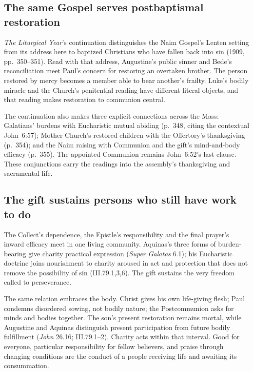 \subsection*{The same Gospel serves postbaptismal restoration}

\emph{The Liturgical Year}'s continuation distinguishes the Naim Gospel's
Lenten setting from its address here to baptized Christians who have fallen
back into sin (1909, pp.~350--351). Read with that address, Augustine's
public sinner and Bede's reconciliation meet Paul's concern for restoring
an overtaken brother. The person restored by mercy becomes a
member able to bear another's frailty. Luke's bodily miracle and the
Church's penitential reading have different literal objects, and that
reading makes restoration to communion central.

The continuation also makes three explicit connections across the Mass:
Galatians' burdens with Eucharistic mutual abiding (p.~348, citing the
contextual John~6:57); Mother Church's restored children with the
Offertory's thanksgiving (p.~354); and the Naim raising with Communion and
the gift's mind-and-body efficacy (p.~355). The appointed Communion remains
John~6:52's last clause. These conjunctions carry the readings into the
assembly's thanksgiving and sacramental life.

\subsection*{The gift sustains persons who still have work to do}

The Collect's dependence, the Epistle's responsibility and the final prayer's
inward efficacy meet in one living community. Aquinas's three forms of
burden-bearing give charity practical expression (\emph{Super Galatas}
6.1); his Eucharistic doctrine joins nourishment to charity aroused in act
and protection that does not remove the possibility of sin
(III.79.1,3,6). The gift sustains the very freedom called to perseverance.

The same relation embraces the body. Christ gives his own life-giving flesh;
Paul condemns disordered sowing, not bodily nature; the Postcommunion asks
for minds and bodies together. The son's present restoration remains
mortal, while Augustine and Aquinas distinguish present participation from
future bodily fulfillment (\emph{John} 26.16; III.79.1--2).
Charity acts within that interval. Good for everyone, particular
responsibility for fellow believers, and praise through changing conditions
are the conduct of a people receiving life and awaiting its consummation.
